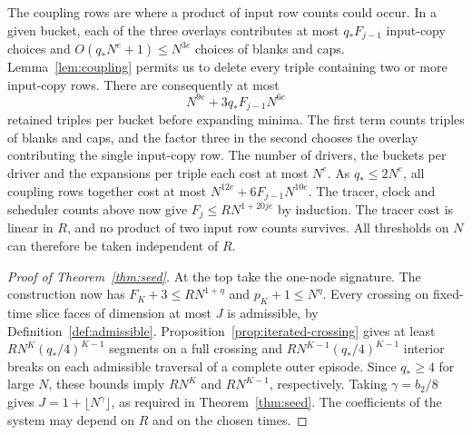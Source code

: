 The coupling rows are where a product of input row counts could occur.
In a given bucket, each of the three overlays contributes at most
$q_*F_{j-1}$ input-copy choices and $O(q_* N^e+1)\le N^{3e}$ choices
of blanks and caps. Lemma~\ref{lem:coupling} permits us to delete every
triple containing two or more input-copy rows. There are consequently at
most
\[
                 N^{9e}+3q_*F_{j-1}N^{6e}
\]
retained triples per bucket before expanding minima. The first term counts
triples of blanks and caps, and the factor three in the second chooses the
overlay contributing the single input-copy row. The number of drivers,
the buckets per driver and the expansions per triple each cost at most
$N^e$. As $q_*\le2N^e$, all coupling rows together cost at most
$N^{12e}+6F_{j-1}N^{10e}$. The tracer, clock and scheduler counts above
now give $F_j\le RN^{1+20je}$ by induction. The tracer cost is linear
in $R$, and no product of two input row counts survives. All thresholds
on $N$ can therefore be taken independent of $R$.

\begin{proof}[Proof of Theorem~\ref{thm:seed}]
At the top take the one-node signature. The construction now has
$F_K+3\le R N^{1+\eta}$ and $p_K+1\le N^\eta$. Every crossing on fixed-time
slice faces of dimension at most $J$ is admissible, by
Definition~\ref{def:admissible}. Proposition~\ref{prop:iterated-crossing}
gives at least $RN^K(q_*/4)^{K-1}$ segments on a full crossing and
$RN^{K-1}(q_*/4)^{K-1}$ interior breaks on each admissible traversal of a complete outer
episode. Since $q_*\ge4$ for large $N$, these bounds imply $RN^K$ and
$RN^{K-1}$, respectively. Taking $\gamma=b_2/8$ gives $J=1+\lfloor N^\gamma\rfloor$,
as required in Theorem~\ref{thm:seed}. The coefficients of the system
may depend on $R$ and on the chosen times.
\end{proof}
